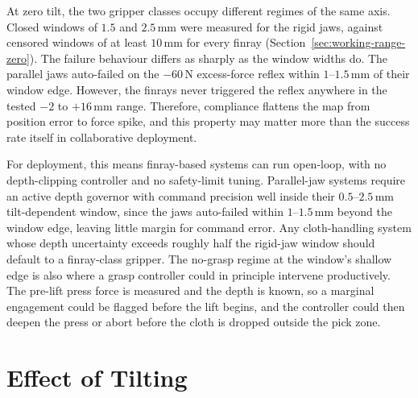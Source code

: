 At zero tilt, the two gripper classes occupy different regimes of the
same axis. Closed windows of $1.5$ and $2.5$\,mm were measured for the
rigid jaws, against censored windows of at least $10$\,mm for every
finray (Section~\ref{sec:working-range-zero}). The failure behaviour
differs as sharply as the window widths do. The parallel jaws auto-failed
on the $-60$\,N excess-force reflex within $1$--$1.5$\,mm of their
window edge. However, the finrays never triggered the reflex anywhere in
the tested $-2$ to $+16$\,mm range. Therefore, compliance flattens the
map from position error to force spike, and this property may matter
more than the success rate itself in collaborative deployment.

For deployment, this means finray-based systems can run
open-loop, with no depth-clipping controller and no safety-limit
tuning. Parallel-jaw systems require an active depth governor with
command precision well inside their $0.5$--$2.5$\,mm tilt-dependent
window, since the jaws auto-failed within $1$--$1.5$\,mm beyond the
window edge, leaving little margin for command error. Any
cloth-handling system whose depth uncertainty exceeds roughly half the
rigid-jaw window should default to a finray-class gripper. The
no-grasp regime at the window's shallow edge is also where a grasp
controller could in principle intervene productively. The pre-lift
press force is measured and the depth is known, so a marginal
engagement could be flagged before the lift begins, and the controller
could then deepen the press or abort before the cloth is dropped
outside the pick zone.

\section{Effect of Tilting}
\label{sec:tilt-discussion}
\label{sec:asymmetries}
\label{sec:cross-axis-mechanism}
\label{sec:depth-gating-mechanism}

